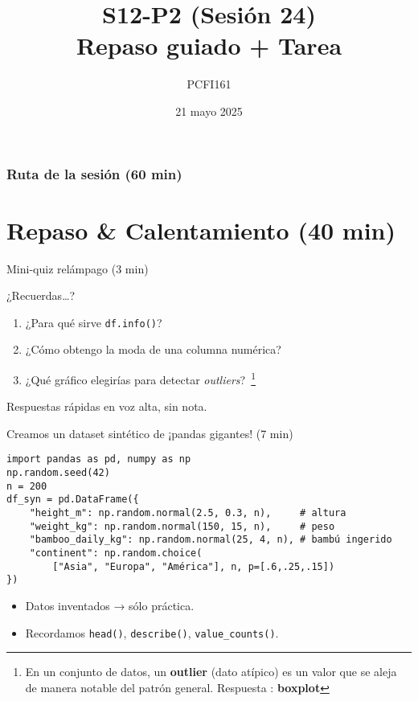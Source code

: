 \documentclass[10pt]{beamer}
\title{S12-P2 (Sesión 24)\\Repaso guiado + Tarea}
\author{PCFI161}
\date{21 mayo 2025}
\begin{document}
\myfront{}

\begin{frame}
  \titlepage
\end{frame}

\begin{frame}
  \frametitle{Ruta de la sesión (60 min)}
  \tableofcontents
\end{frame}


\section{Repaso \& Calentamiento (40 min)}

\begin{frame}{Mini-quiz relámpago (3 min)}
\begin{block}{¿Recuerdas…?}
\begin{enumerate}
  \item ¿Para qué sirve \texttt{df.info()}?
  \item ¿Cómo obtengo la moda de una columna numérica?
  \item ¿Qué gráfico elegirías para detectar \textit{outliers}?~\footnote{En un conjunto de datos, un \textbf{outlier} (dato atípico) es un valor que se aleja de manera notable del patrón general. Respuesta : \textbf{boxplot}}
\end{enumerate}
\end{block}
{\scriptsize Respuestas rápidas en voz alta, sin nota.}
\end{frame}

\begin{frame}[fragile]{Creamos un dataset sintético de ¡pandas gigantes! (7 min)}
\begin{verbatim}
import pandas as pd, numpy as np
np.random.seed(42)
n = 200
df_syn = pd.DataFrame({
    "height_m": np.random.normal(2.5, 0.3, n),     # altura
    "weight_kg": np.random.normal(150, 15, n),     # peso
    "bamboo_daily_kg": np.random.normal(25, 4, n), # bambú ingerido
    "continent": np.random.choice(
        ["Asia", "Europa", "América"], n, p=[.6,.25,.15])
})
\end{verbatim}

\begin{itemize}
  \item Datos inventados → sólo práctica.
  \item Recordamos \texttt{head()}, \texttt{describe()}, \texttt{value\_counts()}.
\end{itemize}
\end{frame}
\end{document}
